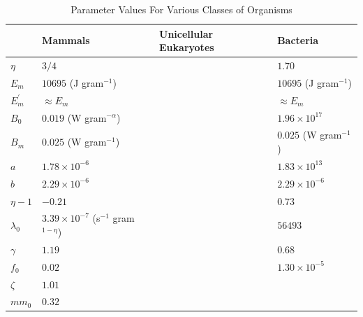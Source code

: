 \documentclass{pnastwo}
\begin{document}
% 
% 
%	 
%
%
%
%
%	 
% 
%	
%
\clearpage

\begin{table}[h]
\caption{Parameter Values For Various Classes of Organisms}
\label{param}
    \begin{center}
    \small
     \begin{tabular}{| p{1.2cm}| p{3.2cm} | p{2.6cm} | p{3.2cm} | }
     \hline
     & {\bf Mammals} & {\bf Unicellular Eukaryotes} & {\bf Bacteria} \\
     \hline
   $\eta$ & $3/4$ & & $1.70$ \\ 
   $E_{m}$ & $10695$ (J gram$^{-1}$) & & $10695$ (J gram$^{-1}$) \\ 
   $E_{m}^{\prime}$ & $\approx E_{m}$ & & $\approx E_{m}$ \\ 
   $B_{0}$ & $0.019$ (W gram$^{-\alpha}$) & & $1.96\times10^{17}$ \\
   $B_{m}$ & $0.025$ (W gram$^{-1}$)   & & $0.025$ (W gram$^{-1}$)\\
   $a$ & $1.78\times10^{-6}$ & & $1.83\times10^{13}$ \\ 
   $b$ & $2.29\times10^{-6}$ & & $2.29\times10^{-6}$ \\  
   $\eta-1$ & $-0.21$ & & $0.73$ \\ 
   $\lambda_{0}$ & $3.39\times10^{-7}$ (s$^{-1}$ gram$^{1-\eta}$) & & $56493$ \\ 
   $\gamma$ & $1.19$ & & $0.68$ \\ 
   $f_{0}$ & $0.02$ & & $1.30\times10^{-5}$ \\ 
   $\zeta$ & $1.01$ & & \\ 
   $mm_{0}$ & $0.32$ & & \\ 
   
      
   \hline
    \end{tabular}
    \end{center}
   \end{table}
\end{document}
